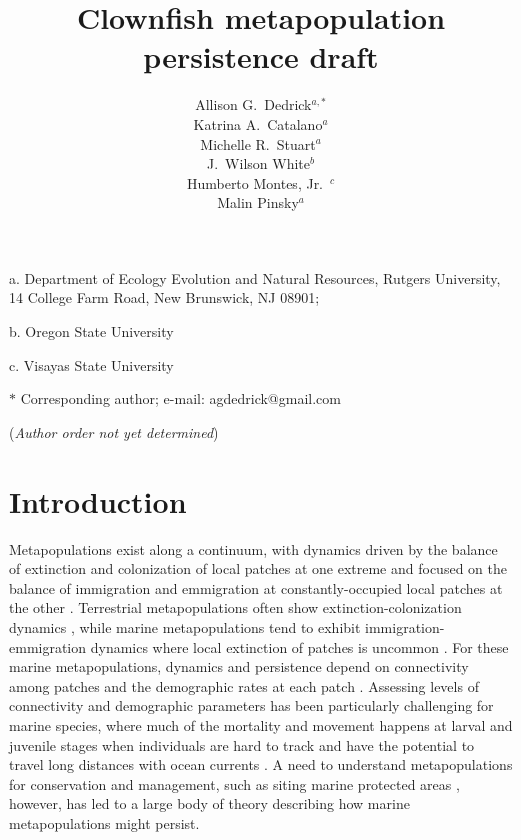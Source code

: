 \documentclass[12pt, oneside]{article}   	%
\author{}
\author{Allison G.\ Dedrick$^{a, \ast}$ \\
Katrina A.\ Catalano$^a$ \\
Michelle R.\ Stuart$^a$ \\
J.\ Wilson White$^b$ \\
Humberto Montes, Jr.\ $^c$ \\
Malin Pinsky$^a$}
\title{Clownfish metapopulation persistence draft}
\date{}
\begin{document}
\renewcommand{\topfraction}{0.95}
\maketitle{}

\noindent{} a. Department of Ecology Evolution and Natural Resources, Rutgers University, 14 College Farm Road, New Brunswick, NJ 08901;

\noindent{} b. Oregon State University

\noindent{} c. Visayas State University

\noindent{} $\ast$ Corresponding author; e-mail: agdedrick@gmail.com

(\textit{Author order not yet determined})


\bigskip



\linenumbers{}
\modulolinenumbers[3]

\section*{Introduction}

Metapopulations exist along a continuum, with dynamics driven by the balance of extinction and colonization of local patches at one extreme and focused on the balance of immigration and emmigration at constantly-occupied local patches at the other \citep{kritzer2006marine}. Terrestrial metapopulations often show extinction-colonization dynamics \citep[e.g.][]{hanski1998metapopulation}, while marine metapopulations tend to exhibit immigration-emmigration dynamics where local extinction of patches is uncommon \citep{kritzer2006marine}. For these marine metapopulations, dynamics and persistence depend on connectivity among patches and the demographic rates at each patch \citep[e.g.][]{hastings_persistence_2006, hanski1998metapopulation}. Assessing levels of connectivity and demographic parameters has been particularly challenging for marine species, where much of the mortality and movement happens at larval and juvenile stages when individuals are hard to track and have the potential to travel long distances with ocean currents \citep[e.g.][]{kritzer2006marine, cowen_larval_2009, roughgarden_recruitment_1988}. A need to understand metapopulations for conservation and management, such as siting marine protected areas \citep[e.g.][]{botsford_dependence_2001,white_population_2010}, however, has led to a large body of theory describing how marine metapopulations might persist. 
\end{document}

